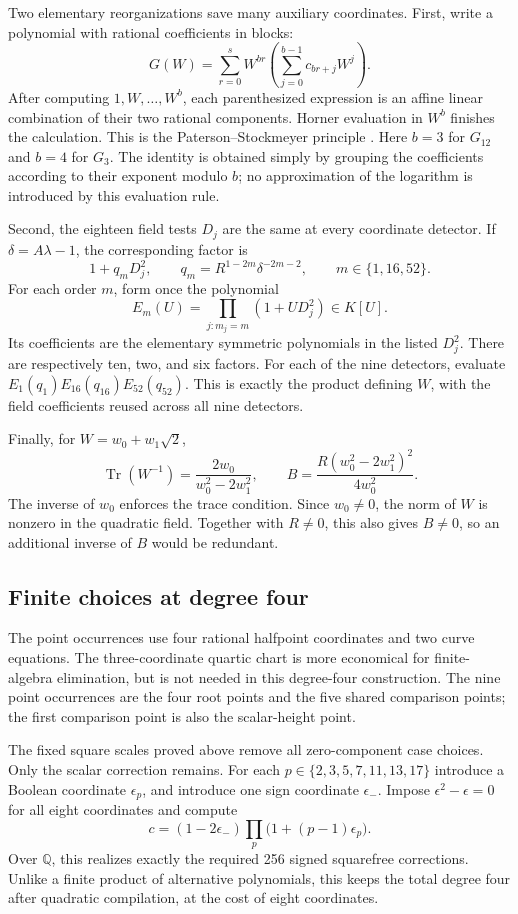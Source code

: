 \documentclass[11pt]{article}
\theoremstyle{definition}
\begin{document}
Two elementary reorganizations save many auxiliary coordinates.  First,
write a polynomial with rational coefficients in blocks:
\[
 G(W)=\sum_{r=0}^s W^{br}
               \left(\sum_{j=0}^{b-1}c_{br+j}W^j\right).
\]
After computing $1,W,\ldots,W^b$, each parenthesized expression is an
affine linear combination of their two rational components.  Horner
evaluation in $W^b$ finishes the calculation.  This is the
Paterson--Stockmeyer principle \cite{PatersonStockmeyer1973}.  Here $b=3$
for $G_{12}$ and $b=4$ for $G_3$.  The identity is obtained simply by
grouping the coefficients according to their exponent modulo $b$; no
approximation of the logarithm is introduced by this evaluation rule.

Second, the eighteen field tests $D_j$ are the same at every coordinate
detector.  If $\delta=A\lambda-1$, the corresponding factor is
\[
 1+q_mD_j^2,\qquad q_m=R^{1-2m}\delta^{-2m-2},
 \qquad m\in\{1,16,52\}.
\]
For each order $m$, form once the polynomial
\[
 E_m(U)=\prod_{j:m_j=m}(1+UD_j^2)\in K[U].
\]
Its coefficients are the elementary symmetric polynomials in the listed
$D_j^2$.  There are respectively ten, two, and six factors.  For each of
the nine detectors, evaluate $E_1(q_1)E_{16}(q_{16})E_{52}(q_{52})$.
This is exactly the product defining $W$, with the field coefficients
reused across all nine detectors.

Finally, for $W=w_0+w_1\sqrt2$,
\[
 \operatorname{Tr}(W^{-1})=\frac{2w_0}{w_0^2-2w_1^2},\qquad
 B=\frac{R(w_0^2-2w_1^2)^2}{4w_0^2}.
\]
The inverse of $w_0$ enforces the trace condition.  Since $w_0\ne0$,
the norm of $W$ is nonzero in the quadratic field.  Together with
$R\ne0$, this also gives $B\ne0$, so an additional inverse of $B$
would be redundant.

\subsection{Finite choices at degree four}

The point occurrences use four rational halfpoint coordinates and two
curve equations.  The three-coordinate quartic chart is more economical
for finite-algebra elimination, but is not needed in this degree-four
construction.  The nine point occurrences are the four root points and
the five shared comparison points; the first comparison point is also
the scalar-height point.

The fixed square scales proved above remove all zero-component case
choices.  Only the scalar correction remains.  For each
$p\in\{2,3,5,7,11,13,17\}$ introduce a Boolean coordinate $\epsilon_p$,
and introduce one sign coordinate $\epsilon_-$.  Impose
$\epsilon^2-\epsilon=0$ for all eight coordinates and compute
\[
 c=(1-2\epsilon_-)\prod_p\bigl(1+(p-1)\epsilon_p\bigr).
\]
Over $\mathbb Q$, this realizes exactly the required 256 signed squarefree
corrections.  Unlike a finite product of alternative polynomials, this
keeps the total degree four after quadratic compilation, at the cost of
eight coordinates.
\end{document}
